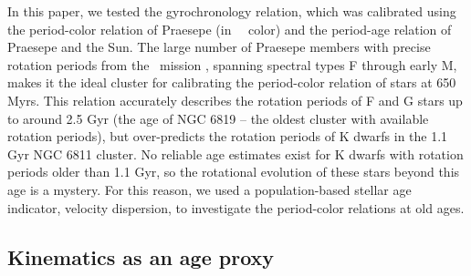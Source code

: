 In this paper, we tested the \citet{angus2019} gyrochronology relation, which
was calibrated using the period-color relation of Praesepe (in \gaia\ \gcolor\
color) and the period-age relation of Praesepe and the Sun.
The large number of Praesepe members with precise rotation periods from the
\ktwo\ mission \citep{douglas2017, rebull2017}, spanning spectral types F
through early M, makes it the ideal cluster for calibrating the period-color
relation of stars at 650 Myrs.
This relation accurately describes the rotation periods of F and G stars up to
around 2.5 Gyr (the age of NGC 6819 -- the oldest cluster with available
rotation periods), but over-predicts the rotation periods of K dwarfs in the
1.1 Gyr NGC 6811 cluster.
No reliable age estimates exist for K dwarfs with rotation periods older than
1.1 Gyr, so the rotational evolution of these stars beyond this age is a
mystery.
For this reason, we used a population-based stellar age indicator, velocity
dispersion, to investigate the period-color relations at old ages.

\subsection{Kinematics as an age proxy}

